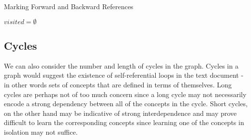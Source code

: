 \documentclass[12pt]{article}
\begin{document}
\begin{algorithm*}
    \caption{Marking Forward and Backward References}
    \label{alg:mark edges}
    \;
    $visited = \emptyset$\;
    \;
    \;
\end{algorithm*}

\subsection{Cycles} 
We can also consider the number and length of cycles in the graph. Cycles in a graph would suggest the existence of self-referential loops in the text document - in other words sets of concepts that are defined in terms of themselves. Long cycles are perhaps not of too much concern since a long cycle may not necessarily encode a strong dependency between all of the concepts in the cycle. Short cycles, on the other hand may be indicative of strong interdependence and may prove difficult to learn the corresponding concepts since learning one of the concepts in isolation may not suffice.
\end{document}
